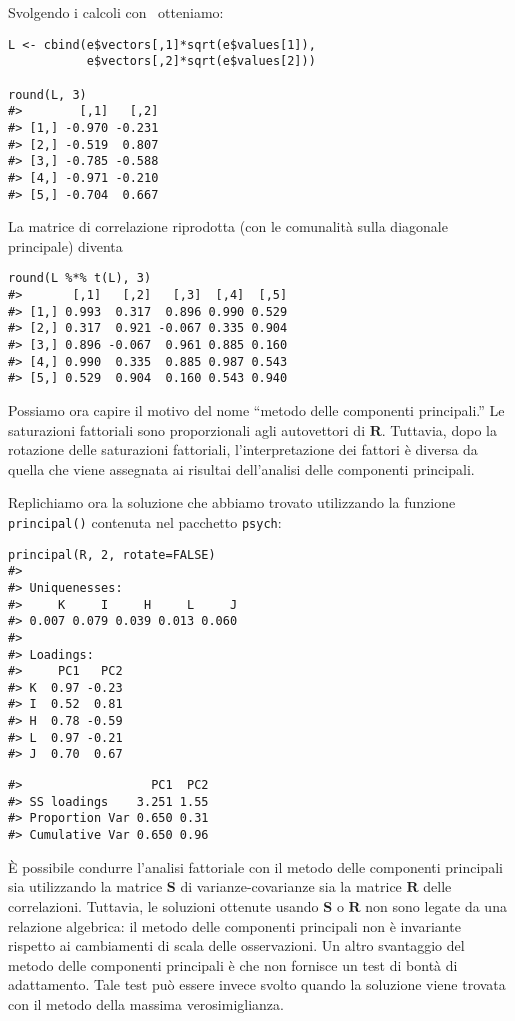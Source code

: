 Svolgendo i calcoli con \R\, otteniamo:
\begin{lstlisting}
L <- cbind(e$vectors[,1]*sqrt(e$values[1]), 
           e$vectors[,2]*sqrt(e$values[2]))

round(L, 3)
#>        [,1]   [,2]
#> [1,] -0.970 -0.231
#> [2,] -0.519  0.807
#> [3,] -0.785 -0.588
#> [4,] -0.971 -0.210
#> [5,] -0.704  0.667
\end{lstlisting}
La matrice di correlazione riprodotta (con le comunalità sulla diagonale principale) diventa 
\begin{lstlisting}
round(L %*% t(L), 3)
#>       [,1]   [,2]   [,3]  [,4]  [,5]
#> [1,] 0.993  0.317  0.896 0.990 0.529
#> [2,] 0.317  0.921 -0.067 0.335 0.904
#> [3,] 0.896 -0.067  0.961 0.885 0.160
#> [4,] 0.990  0.335  0.885 0.987 0.543
#> [5,] 0.529  0.904  0.160 0.543 0.940
\end{lstlisting}

\noindent
Possiamo ora capire il motivo del nome ``metodo delle componenti principali.''  Le saturazioni fattoriali sono proporzionali agli autovettori di $\textbf{R}$. Tuttavia, dopo la rotazione delle saturazioni fattoriali, l'interpretazione dei fattori è diversa da quella che viene assegnata ai risultai dell'analisi delle componenti principali. 
  
Replichiamo ora la soluzione che abbiamo trovato utilizzando la funzione {\tt principal()} contenuta nel pacchetto {\tt psych}: 
\begin{lstlisting}
principal(R, 2, rotate=FALSE)
#> 
#> Uniquenesses:
#>     K     I     H     L     J 
#> 0.007 0.079 0.039 0.013 0.060 
#> 
#> Loadings:
#>     PC1   PC2  
#> K  0.97 -0.23
#> I  0.52  0.81
#> H  0.78 -0.59
#> L  0.97 -0.21
#> J  0.70  0.67
\end{lstlisting}

\begin{lstlisting}
#>                  PC1  PC2
#> SS loadings    3.251 1.55
#> Proportion Var 0.650 0.31
#> Cumulative Var 0.650 0.96
\end{lstlisting}

È possibile condurre l'analisi fattoriale con il metodo delle componenti principali sia utilizzando la matrice $\textbf{S}$ di varianze-co\-va\-rian\-ze sia la matrice  $\textbf{R}$ delle correlazioni. Tuttavia, le soluzioni ottenute usando $\textbf{S}$ o $\textbf{R}$  non sono legate da una relazione algebrica: il metodo delle componenti principali non è invariante rispetto ai cambiamenti di scala delle osservazioni. Un altro svantaggio del metodo delle componenti principali è che non fornisce un test di bontà di adattamento. Tale test può essere invece svolto quando la soluzione viene trovata con il metodo della massima verosimiglianza.


